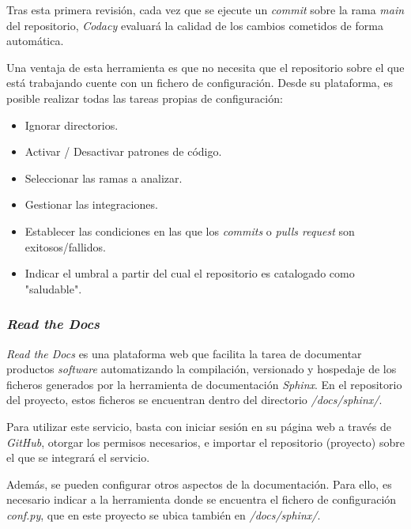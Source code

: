 \documentclass[
]{article}
\providecommand{\tightlist}{%
  \setlength{\itemsep}{0pt}\setlength{\parskip}{0pt}}
\begin{document}
Tras esta primera revisión, cada vez que se ejecute un \emph{commit}
sobre la rama \emph{main} del repositorio, \emph{Codacy} evaluará la
calidad de los cambios cometidos de forma automática.

Una ventaja de esta herramienta es que no necesita que el repositorio
sobre el que está trabajando cuente con un fichero de configuración.
Desde su plataforma, es posible realizar todas las tareas propias de
configuración:

\begin{itemize}
\tightlist
\item
  Ignorar directorios.
\item
  Activar / Desactivar patrones de código.
\item
  Seleccionar las ramas a analizar.
\item
  Gestionar las integraciones.
\item
  Establecer las condiciones en las que los \emph{commits} o \emph{pulls
  request} son exitosos/fallidos.
\item
  Indicar el umbral a partir del cual el repositorio es catalogado como
  "saludable".
\end{itemize}

\hypertarget{read-the-docs}{%
\subsubsection{\texorpdfstring{\emph{Read the
Docs}}{Read the Docs}}\label{read-the-docs}}

\emph{Read the Docs} es una plataforma web que facilita la tarea de
documentar productos \emph{software} automatizando la compilación,
versionado y hospedaje de los ficheros generados por la herramienta de
documentación \emph{Sphinx}. En el repositorio del proyecto, estos
ficheros se encuentran dentro del directorio \emph{/docs/sphinx/}.

Para utilizar este servicio, basta con iniciar sesión en su página web a
través de \emph{GitHub}, otorgar los permisos necesarios, e importar el
repositorio (proyecto) sobre el que se integrará el servicio.

Además, se pueden configurar otros aspectos de la documentación. Para
ello, es necesario indicar a la herramienta donde se encuentra el
fichero de configuración \emph{conf.py}, que en este proyecto se ubica
también en \emph{/docs/sphinx/}.
\end{document}
